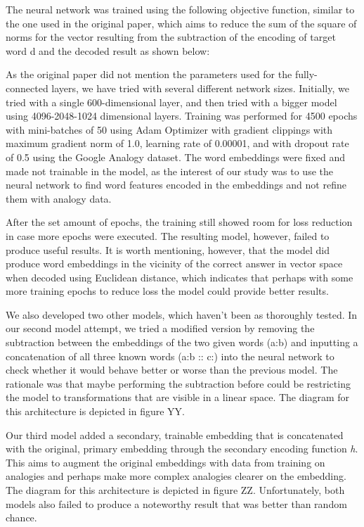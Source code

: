 \documentclass[11pt]{article}
\begin{document}
The neural network was trained using the following objective function,
similar to the one used in the original paper, which aims to reduce the
sum of the square of norms for the vector resulting from the subtraction
of the encoding of target word d and the decoded result as shown below:


As the original paper did not mention the parameters used for the
fully-connected layers, we have tried with several different network
sizes. Initially, we tried with a single 600-dimensional layer, and then
tried with a bigger model using 4096-2048-1024 dimensional layers.
Training was performed for 4500 epochs with mini-batches of 50 using
Adam Optimizer with gradient clippings with maximum gradient norm of
1.0, learning rate of 0.00001, and with dropout rate of 0.5 using the
Google Analogy dataset. The word embeddings were fixed and made not
trainable in the model, as the interest of our study was to use the
neural network to find word features encoded in the embeddings and not
refine them with analogy data.

After the set amount of epochs, the training still showed room for loss
reduction in case more epochs were executed. The resulting model,
however, failed to produce useful results. It is worth mentioning,
however, that the model did produce word embeddings in the vicinity of
the correct answer in vector space when decoded using Euclidean
distance, which indicates that perhaps with some more training epochs to
reduce loss the model could provide better results.

We also developed two other models, which haven't been as thoroughly
tested. In our second model attempt, we tried a modified version by
removing the subtraction between the embeddings of the two given words
(a:b) and inputting a concatenation of all three known words (a:b :: c:)
into the neural network to check whether it would behave better or worse
than the previous model. The rationale was that maybe performing the
subtraction before could be restricting the model to transformations
that are visible in a linear space. The diagram for this architecture is
depicted in figure YY.

Our third model added a secondary, trainable embedding that is
concatenated with the original, primary embedding through the secondary
encoding function \emph{h}. This aims to augment the original embeddings
with data from training on analogies and perhaps make more complex
analogies clearer on the embedding. The diagram for this architecture is
depicted in figure ZZ. Unfortunately, both models also failed to produce
a noteworthy result that was better than random chance.
\end{document}
